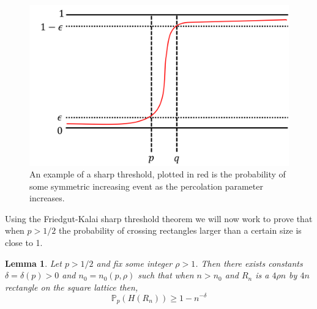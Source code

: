 \documentclass[a4paper,11pt]{article}
\newtheorem{lemma}[theorem]{Lemma}
\theoremstyle{definition}
\newcommand{\prob}{\mathbb{P}_p}
\begin{document}
\begin{figure}
	\centering
	\includegraphics[scale=0.62]{drawings/sharpThreshold.png}
	\caption{An example of a sharp threshold, plotted in red is the probability of some symmetric increasing event as the percolation parameter increases.}
	\label{fig:sharpThreshold}
\end{figure}

Using the Friedgut-Kalai sharp threshold theorem we will now work to prove that when $p>1/2$ the probability of crossing rectangles larger than a certain size is close to 1.

\begin{lemma}\label{kesternLemma}
	Let $p >1/2$ and fix some integer $\rho >1$. Then there exists constants $\delta = \delta(p) > 0$ and $n_0 = n_0(p,\rho)$ such that when $n > n_0$ and $R_n$ is a $4\rho n$ by $4n$ rectangle on the square lattice then, $$\prob(H(R_n)) \geq 1-n^{-\delta}$$
\end{lemma}
\end{document}
